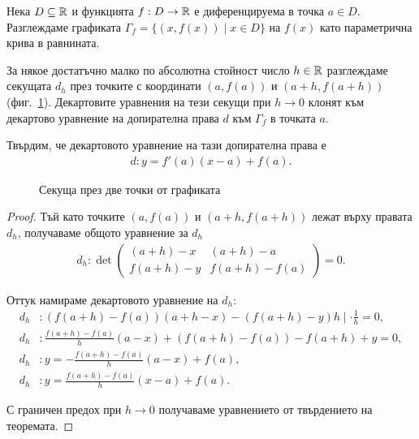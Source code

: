 \documentclass[numbers=endperiod, bibliography=totocnumbered]{scrartcl}
\begin{document}
\bigskip
\begin{minipage}{0.45\textwidth}
  \begin{theorem}
    Нека \( D \subseteq \mathbb{R} \) и функцията \( f: D \to \mathbb{R} \) е диференцируема в точка \( a \in D \). Разглеждаме графиката \( \Gamma_f = \{ (x, f(x)) \mid x \in D \} \) на \( f(x) \) като параметрична крива в равнината.

    За някое достатъчно малко по абсолютна стойност число \( h \in \mathbb{R} \) разглеждаме секущата \( d_h \) през точките с координати \( (a, f(a)) \) и \( (a+h, f(a+h)) \) (фиг.~\ref{fig:secant}). Декартовите уравнения на тези секущи при \( h \to 0 \) клонят към декартово уравнение на допирателна права \( d \) към \( \Gamma_f \) в точката \( a \).

    Твърдим, че декартовото уравнение на тази допирателна права е
    \begin{align*}
      d: y = f'(a) (x-a) + f(a).
    \end{align*}
  \end{theorem}
\end{minipage}
\begin{minipage}{0.45\textwidth}
  \begin{figure}[H]
    \begin{Center}
    \end{Center}
    \caption{Секуща през две точки от графиката}\label{fig:secant}
  \end{figure}
\end{minipage}
\begin{proof}
  Тъй като точките \( (a, f(a)) \) и \( (a+h, f(a+h)) \) лежат върху правата \( d_h \), получаваме общото уравнение за \( d_h \)
    \begin{align*}
      d_h: \det \begin{pmatrix}
      (a+h)-x & (a+h)-a \\
      f(a+h)-y & f(a+h)-f(a)
    \end{pmatrix}
    = 0.
  \end{align*}

  Оттук намираме декартовото уравнение на \( d_h \):
  \begin{align*}
    d_h&: (f(a+h) - f(a)) (a+h-x) - (f(a+h)-y)h \mid \cdot \frac 1 h = 0,
    \\
    d_h&: \frac {f(a+h) - f(a)} h (a-x) + (f(a+h) - f(a)) - f(a+h) + y = 0,
    \\
    d_h&: y = -\frac {f(a+h) - f(a)} h (a-x) + f(a),
    \\
    d_h&: y = \frac {f(a+h) - f(a)} h (x-a) + f(a).
  \end{align*}

  С граничен предох при \( h \to 0 \) получаваме уравнението от твърдението на теоремата.
\end{proof}
\end{document}

